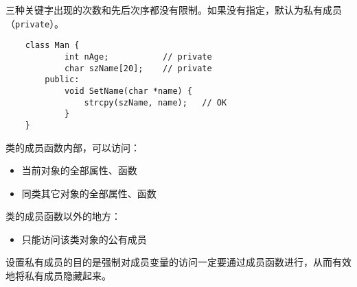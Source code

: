 \documentclass[UTF8]{ctexart}
\begin{document}
三种关键字出现的次数和先后次序都没有限制。如果没有指定，默认为私有成员（\texttt{private}）。
\begin{verbatim}
    class Man {
            int nAge;           // private
            char szName[20];    // private
        public:
            void SetName(char *name) {
                strcpy(szName, name);   // OK
            }
    }
\end{verbatim}

类的成员函数内部，可以访问：
\begin{itemize}
    \item 当前对象的全部属性、函数
    \item 同类其它对象的全部属性、函数
\end{itemize}

类的成员函数以外的地方：
\begin{itemize}
    \item 只能访问该类对象的公有成员
\end{itemize}

设置私有成员的目的是强制对成员变量的访问一定要通过成员函数进行，从而有效地将私有成员隐藏起来。
\end{document}
